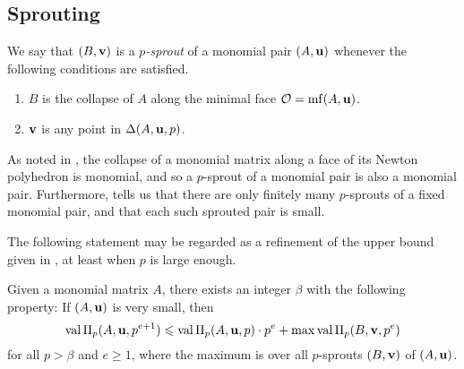 \documentclass[11pt]{amsart}
\begin{document}

\subsection{Sprouting}

\begin{definition}
\label{p-sprout: D}
We say that $(B, \mathbf{v})$ is a \emph{$p$-sprout} of a monomial pair $(A, \mathbf{u})$ whenever the following conditions are satisfied.
\begin{enumerate}
\item $B$ is the collapse of $A$ along the minimal face $\mathcal{O} = \operatorname{mf}(A, \mathbf{u})$.
\item $\mathbf{v}$ is any point in $\Delta(A, \mathbf{u}, p)$.
\end{enumerate}
\end{definition}



\begin{remark}
\label{p-sprout: R}
As noted in , the collapse of a monomial matrix along a face of its Newton polyhedron is monomial, and so a $p$-sprout of a monomial pair is also a monomial pair.  Furthermore,    tells us that there are only finitely many $p$-sprouts of a fixed monomial pair, and that each such sprouted pair is small.
 \end{remark}

The following statement may be regarded as a refinement of the upper bound given in , at least when $p$ is large enough.


\begin{corollary}\label{cor: upper bound for higher mus}
Given a monomial matrix $A$, there exists an integer $\beta$ with the following property\textup:  If $(A, \mathbf{u})$ is very small, then
%
\[ \operatorname{val} \Pi_p(A, \mathbf{u}, p^{e+1})  \leqslant  \operatorname{val} \Pi_p(A, \mathbf{u}, p) \cdot p^e +  \max \operatorname{val} \Pi_p(B, \mathbf{v}, p^e) \]
%
for all $p > \beta$ and $e \geq 1$, where the maximum is over all $p$-sprouts $(B, \mathbf{v})$ of $(A, \mathbf{u})$.
\end{corollary}
\end{document}
